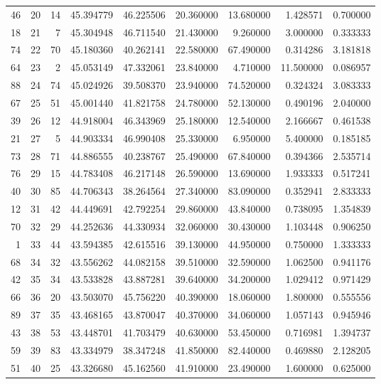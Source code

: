 \begin{tabular}{rrrrrrrrr}
46 & 20 & 14 & 45.394779 & 46.225506 & 20.360000 & 13.680000 & 1.428571 & 0.700000 \\
18 & 21 & 7 & 45.304948 & 46.711540 & 21.430000 & 9.260000 & 3.000000 & 0.333333 \\
74 & 22 & 70 & 45.180360 & 40.262141 & 22.580000 & 67.490000 & 0.314286 & 3.181818 \\
64 & 23 & 2 & 45.053149 & 47.332061 & 23.840000 & 4.710000 & 11.500000 & 0.086957 \\
88 & 24 & 74 & 45.024926 & 39.508370 & 23.940000 & 74.520000 & 0.324324 & 3.083333 \\
67 & 25 & 51 & 45.001440 & 41.821758 & 24.780000 & 52.130000 & 0.490196 & 2.040000 \\
39 & 26 & 12 & 44.918004 & 46.343969 & 25.180000 & 12.540000 & 2.166667 & 0.461538 \\
21 & 27 & 5 & 44.903334 & 46.990408 & 25.330000 & 6.950000 & 5.400000 & 0.185185 \\
73 & 28 & 71 & 44.886555 & 40.238767 & 25.490000 & 67.840000 & 0.394366 & 2.535714 \\
76 & 29 & 15 & 44.783408 & 46.217148 & 26.590000 & 13.690000 & 1.933333 & 0.517241 \\
40 & 30 & 85 & 44.706343 & 38.264564 & 27.340000 & 83.090000 & 0.352941 & 2.833333 \\
12 & 31 & 42 & 44.449691 & 42.792254 & 29.860000 & 43.840000 & 0.738095 & 1.354839 \\
70 & 32 & 29 & 44.252636 & 44.330934 & 32.060000 & 30.430000 & 1.103448 & 0.906250 \\
1 & 33 & 44 & 43.594385 & 42.615516 & 39.130000 & 44.950000 & 0.750000 & 1.333333 \\
68 & 34 & 32 & 43.556262 & 44.082158 & 39.510000 & 32.590000 & 1.062500 & 0.941176 \\
42 & 35 & 34 & 43.533828 & 43.887281 & 39.640000 & 34.200000 & 1.029412 & 0.971429 \\
66 & 36 & 20 & 43.503070 & 45.756220 & 40.390000 & 18.060000 & 1.800000 & 0.555556 \\
89 & 37 & 35 & 43.468165 & 43.870047 & 40.370000 & 34.060000 & 1.057143 & 0.945946 \\
43 & 38 & 53 & 43.448701 & 41.703479 & 40.630000 & 53.450000 & 0.716981 & 1.394737 \\
59 & 39 & 83 & 43.334979 & 38.347248 & 41.850000 & 82.440000 & 0.469880 & 2.128205 \\
51 & 40 & 25 & 43.326680 & 45.162560 & 41.910000 & 23.490000 & 1.600000 & 0.625000 \\

\end{tabular}
